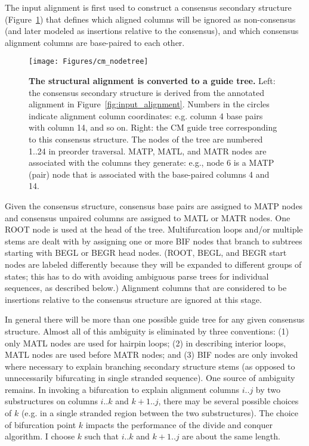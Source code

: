 \documentclass[11pt]{article}
\begin{document}
The input alignment is first used to construct a consensus secondary
structure (Figure~\ref{fig:cm_nodetree}) that defines which aligned
columns will be ignored as non-consensus (and later modeled as
insertions relative to the consensus), and which consensus alignment
columns are base-paired to each other.

\begin{figure}[t]
\begin{center}
\texttt{[image: Figures/cm\_nodetree]}
\end{center}
\caption{\textbf{The structural alignment is converted to a guide
tree.} Left: the consensus secondary structure is derived from the
annotated alignment in Figure~\ref{fig:input_alignment}. Numbers in
the circles indicate alignment column coordinates: e.g.  column 4 base
pairs with column 14, and so on. Right: the CM guide tree
corresponding to this consensus structure. The nodes of the tree are
numbered 1..24 in preorder traversal. MATP, MATL, and MATR nodes are
associated with the columns they generate: e.g., node 6 is a MATP
(pair) node that is associated with the base-paired columns 4 and 14.}
\label{fig:cm_nodetree}
\end{figure}

Given the consensus structure, consensus base pairs are assigned to
MATP nodes and consensus unpaired columns are assigned to MATL or MATR
nodes. One ROOT node is used at the head of the tree.  Multifurcation
loops and/or multiple stems are dealt with by assigning one or more
BIF nodes that branch to subtrees starting with BEGL or BEGR head
nodes. (ROOT, BEGL, and BEGR start nodes are labeled differently
because they will be expanded to different groups of states; this has
to do with avoiding ambiguous parse trees for individual sequences, as
described below.) Alignment columns that are considered to be
insertions relative to the consensus structure are ignored at this
stage.

In general there will be more than one possible guide tree for any
given consensus structure. Almost all of this ambiguity is eliminated
by three conventions: (1) only MATL nodes are used for hairpin loops;
(2) in describing interior loops, MATL nodes are used before MATR
nodes; and (3) BIF nodes are only invoked where necessary to explain
branching secondary structure stems (as opposed to unnecessarily
bifurcating in single stranded sequence). One source of ambiguity
remains. In invoking a bifurcation to explain alignment columns $i..j$
by two substructures on columns $i..k$ and $k+1..j$, there may be
several possible choices of $k$ (e.g. in a single stranded region
between the two substructures). The choice of bifurcation point $k$
impacts the performance of the divide and conquer algorithm.  I choose
$k$ such that $i..k$ and $k+1..j$ are about the same length.
\end{document}
